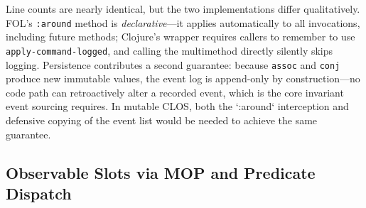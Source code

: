 \documentclass[sigconf,nonacm,review]{acmart}
\begin{document}
Line counts are nearly identical, but the two implementations differ qualitatively. FOL's \texttt{:around} method is \textit{declarative}---it applies automatically to all invocations, including future methods;
Clojure's wrapper requires callers to remember to use \texttt{apply-command-logged}, and calling the multimethod directly silently skips logging. Persistence contributes a second guarantee: because \texttt{assoc}
and \texttt{conj} produce new immutable values, the event log is append-only by construction---no code path can retroactively alter a recorded event, which is the core invariant event sourcing requires. In mutable
CLOS, both the `:around` interception and defensive copying of the event list would be needed to achieve the same guarantee.

\subsection{Observable Slots via MOP and Predicate Dispatch}
\end{document}
